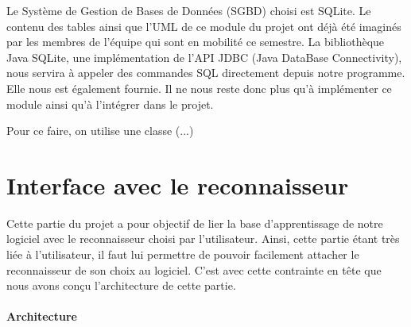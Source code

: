 Le Système de Gestion de Bases de Données (SGBD) choisi est SQLite. Le contenu des tables ainsi que l'UML de ce module du projet ont déjà été imaginés par les membres de l'équipe qui sont en mobilité ce semestre. La bibliothèque Java SQLite, une implémentation de l'API JDBC (Java DataBase Connectivity), nous servira à appeler des commandes SQL directement depuis notre programme. Elle nous est également fournie. Il ne nous reste donc plus qu'à implémenter ce module ainsi qu'à l'intégrer dans le projet.

Pour ce faire, on utilise une classe (...)

\section{Interface avec le reconnaisseur}

Cette partie du projet a pour objectif de lier la base d'apprentissage de notre logiciel avec le reconnaisseur choisi par l'utilisateur. Ainsi, cette partie étant très liée à l'utilisateur, il faut lui permettre de pouvoir facilement attacher le reconnaisseur de son choix au logiciel. C'est avec cette contrainte en tête que nous avons conçu l'architecture de cette partie.



\paragraph{Architecture}

